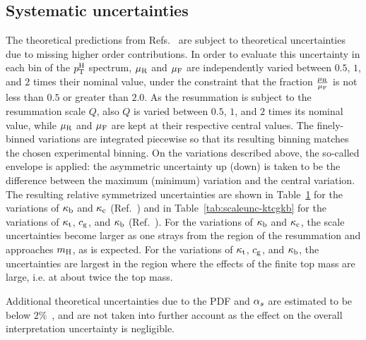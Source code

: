 \subsection{Systematic uncertainties}
\label{sec:interpretation-systematics}

The theoretical predictions from Refs.~\cite{Bishara:2016jga,Grazzini:2017szg,Grazzini:2016paz} are subject to theoretical uncertainties due to missing higher order contributions.
% 
In order to evaluate this uncertainty in each bin of the $p_\mathrm{T}^\mathrm{H}$ spectrum, $\mu_\mathrm{R}$ and $\mu_\mathrm{F}$ are independently varied between $0.5$, $1$, and $2$ times their nominal value, under the constraint that the fraction $\frac{\mu_\mathrm{R}}{\mu_\mathrm{F}}$ is not less than $0.5$ or greater than $2.0$.
% 
As the resummation is subject to the resummation scale $Q$, also $Q$ is varied between $0.5$, $1$, and $2$ times its nominal value, while $\mu_\mathrm{R}$ and $\mu_\mathrm{F}$ are kept at their respective central values.
% 
The finely-binned variations are integrated piecewise so that its resulting binning matches the chosen experimental binning.
% 
On the variations described above, the so-called envelope is applied: the asymmetric uncertainty up (down) is taken to be the difference between the maximum (minimum) variation and the central variation.
% 
The resulting relative symmetrized uncertainties are shown in Table~\ref{tab:scaleunc-kbkc} for the variations of $\kappa_{\mathrm{b}}$ and $\kappa_{\mathrm{c}}$ (Ref.~\cite{Bishara:2016jga}) and in Table~\ref{tab:scaleunc-ktcgkb} for the variations of $\kappa_{\mathrm{t}}$, $c_\mathrm{g}$, and $\kappa_{\mathrm{b}}$ (Ref.~\cite{Grazzini:2017szg,Grazzini:2016paz}).
% 
For the variations of $\kappa_{\mathrm{b}}$ and $\kappa_{\mathrm{c}}$, the scale uncertainties become larger as one strays from the region of the resummation and approaches $m_{\mathrm{H}}$, as is expected.
% 
For the variations of $\kappa_{\mathrm{t}}$, $c_\mathrm{g}$, and $\kappa_{\mathrm{b}}$, the uncertainties are largest in the region where the effects of the finite top mass are large, i.e. at about twice the top mass.


Additional theoretical uncertainties due to the PDF and $\alpha_s$ are estimated to be below $2\%$~\cite{Bishara:2016jga}, and are not taken into further account as the effect on the overall interpretation uncertainty is negligible.


\begin{table}[htb]
\centering
{}
\label{tab:scaleunc-kbkc}
\begin{tabular}{lccccc}
\hline

\hline
\end{tabular}
\end{table}

